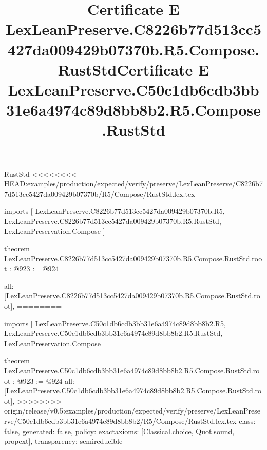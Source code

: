 \begin{lexlean}{RustStd}
<<<<<<<< HEAD:examples/production/expected/verify/preserve/LexLeanPreserve/C8226b77d513cc5427da009429b07370b/R5/Compose/RustStd.lex.tex
\title{Certificate E LexLeanPreserve.C8226b77d513cc5427da009429b07370b.R5.Compose.RustStd}
\begin{coremodule}
imports [
  LexLeanPreserve.C8226b77d513cc5427da009429b07370b.R5,
  LexLeanPreserve.C8226b77d513cc5427da009429b07370b.R5.RustStd,
  LexLeanPreservation.Compose
]

theorem LexLeanPreserve.C8226b77d513cc5427da009429b07370b.R5.Compose.RustStd.root : @923 := @924 {
  all: [LexLeanPreserve.C8226b77d513cc5427da009429b07370b.R5.Compose.RustStd.root],
========
\title{Certificate E LexLeanPreserve.C50c1db6cdb3bb31e6a4974c89d8bb8b2.R5.Compose.RustStd}
\begin{coremodule}
imports [
  LexLeanPreserve.C50c1db6cdb3bb31e6a4974c89d8bb8b2.R5,
  LexLeanPreserve.C50c1db6cdb3bb31e6a4974c89d8bb8b2.R5.RustStd,
  LexLeanPreservation.Compose
]

theorem LexLeanPreserve.C50c1db6cdb3bb31e6a4974c89d8bb8b2.R5.Compose.RustStd.root : @923 := @924 {
  all: [LexLeanPreserve.C50c1db6cdb3bb31e6a4974c89d8bb8b2.R5.Compose.RustStd.root],
>>>>>>>> origin/release/v0.5:examples/production/expected/verify/preserve/LexLeanPreserve/C50c1db6cdb3bb31e6a4974c89d8bb8b2/R5/Compose/RustStd.lex.tex
  class: false,
  generated: false,
  policy: exact{axioms: [Classical.choice, Quot.sound, propext]},
  transparency: semireducible
}


\end{coremodule}}
\end{coremodule}
\end{lexlean}
